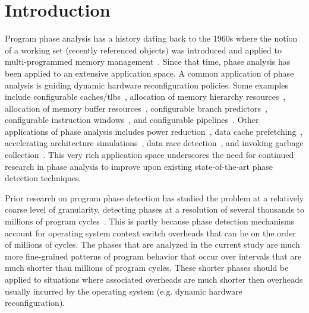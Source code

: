 \section{Introduction}

Program phase analysis has a history dating back to the 1960s where the notion of a working set (recently referenced objects) was introduced and applied to multi-programmed memory management~\cite{Glaser:1965:SDC}. Since that time, phase analysis has been applied to an extensive application space. A common application of phase analysis is guiding dynamic hardware reconfiguration policies. Some examples include configurable caches/tlbs~\cite{903259}\cite{Veidenbaum:1999:ACL}\cite{Albonesi:1999:SCW}, allocation of memory hierarchy resources~\cite{Balasubramonian:2000:MHR}\cite{Ranganathan:2000:RCA}, allocation of memory buffer resources~\cite{Veidenbaum:1999:ACL}, configurable branch predictors~\cite{694771}, configurable instruction windows~\cite{Buyuktosunoglu:2000:AIQ}\cite{Folegnani00reducingpower}, and configurable pipelines~\cite{Bahar:2001:PER}.  Other applications of phase analysis includes power reduction~\cite{Huang:2003:PAP}\cite{Isci:2006:PCP}, data cache prefetching~\cite{Lu:2003:PRD}, accelerating architecture simulations~\cite{Sherwood:2002:ACL}\cite{Perelman:2003:PSV}\cite{Lau:2006:SSP}\cite{Perelman:2006:DPP}, data race detection~\cite{Marino:2009:LES}, and invoking garbage collection~\cite{Xian:2007:MAP}. This very rich application space underscores the need for continued research in phase analysis to improve upon existing state-of-the-art phase detection techniques.

Prior research on program phase detection has studied the problem at a relatively coarse level of granularity, detecting phases at a resolution of several thousands to millions of program cycles~\cite{Lau:2005:MVL}\cite{Huffmire:2006:WPC}\cite{Isci:2006:PCP}.  This is partly because phase detection mechanisms account for operating system context switch overheads that can be on the order of millions of cycles. The phases that are analyzed in the current study are much more fine-grained patterns of program behavior that occur over intervals that are much shorter than millions of program cycles. These shorter phases should be applied to situations where associated overheads are much shorter then overheads usually incurred by the operating system (e.g. dynamic hardware reconfiguration). 

